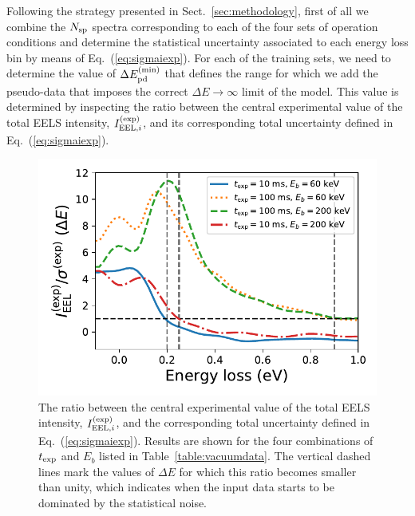 Following the strategy presented in Sect.~\ref{sec:methodology}, first of all we combine the $N_{\rm sp}$ spectra
corresponding to each of the four sets of operation conditions and determine the statistical uncertainty
associated to each energy loss bin by means of Eq.~(\ref{eq:sigmaiexp}).
%
For each of the training sets, we need to determine the value of $\Delta E_{\rm pd}^{\rm (min)}$
that defines the range for which we add the  pseudo-data
that imposes the correct $\Delta E \to \infty$ limit of the model.
%
This value is determined
by inspecting the ratio between the central experimental value of the total
EELS intensity, $I_{{\rm EEL},i}^{(\rm exp)}$, and its corresponding
total uncertainty defined in Eq.~(\ref{eq:sigmaiexp}).


      
\begin{figure}[t]
    \centering
    \includegraphics[width=120mm]{plots/intensity_to_error_ratio.pdf}
    \caption{\small The ratio between the central experimental value of the total
      EELS intensity, $I_{{\rm EEL},i}^{(\rm exp)}$, and the corresponding
      total uncertainty defined in Eq.~(\ref{eq:sigmaiexp}).
      Results are shown for the four combinations of $t_{\rm exp}$
      and $E_{b}$ listed in Table~\ref{table:vacuumdata}.
      The vertical dashed lines mark the values of $\Delta E$ for which
      this ratio becomes smaller than unity, which indicates when the input
      data starts to be dominated by the statistical noise.
      }
    \label{fig:intensityratio}
\end{figure}

